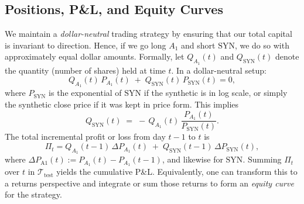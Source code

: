\subsection*{Positions, P\&L, and Equity Curves}
We maintain a \emph{dollar-neutral} trading strategy by ensuring that our total capital is invariant to direction. Hence, if we go long \(A_1\) and short \(\text{SYN}\), we do so with approximately equal dollar amounts. Formally, let \(Q_{A_1}(t)\) and \(Q_{\text{SYN}}(t)\) denote the quantity (number of shares) held at time \(t\). In a dollar-neutral setup:
\[
Q_{A_1}(t) \,P_{A_1}(t) \;+\; Q_{\text{SYN}}(t)\, P_{\text{SYN}}(t) = 0,
\]
where \(P_{\text{SYN}}\) is the exponential of \(\text{SYN}\) if the synthetic is in log scale, or simply the synthetic close price if it was kept in price form. This implies
\[
Q_{\text{SYN}}(t) \;=\; -\,Q_{A_1}(t)\,\frac{ P_{A_1}(t) }{ P_{\text{SYN}}(t) }.
\]
The total incremental profit or loss from day \(t-1\) to \(t\) is
\[
\Pi_t = Q_{A_1}(t-1)\,\Delta P_{A_1}(t) \;+\; Q_{\text{SYN}}(t-1)\,\Delta P_{\text{SYN}}(t),
\]
where \(\Delta P_{\text{A1}}(t) := P_{A_1}(t) - P_{A_1}(t-1)\), and likewise for \(\text{SYN}\). Summing \(\Pi_t\) over \(t\) in \(\mathcal{T}_{\text{test}}\) yields the cumulative P\&L. Equivalently, one can transform this to a returns perspective and integrate or sum those returns to form an \emph{equity curve} for the strategy.

